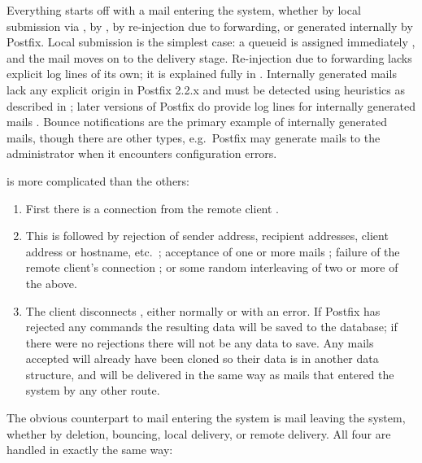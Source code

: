Everything starts off with a mail entering the system, whether by local
submission via , by , by re-injection due to
forwarding, or generated internally by Postfix.  Local submission is the
simplest case: a queueid is assigned immediately , and
the mail moves on to the delivery stage.  Re-injection due to forwarding
lacks explicit log lines of its own; it is explained fully in
.  Internally generated mails lack any
explicit origin in Postfix 2.2.x and must be detected using heuristics as
described in ; later versions
of Postfix do provide log lines for internally generated mails
.  Bounce notifications are the primary
example of internally generated mails, though there are other types, e.g.\
Postfix may generate mails to the administrator when it encounters
configuration errors.

 is more complicated than the others:

\begin{enumerate}

    \item First there is a connection from the remote client
        .

    \item This is followed by rejection of sender address, recipient
        addresses, client \acronym{IP} address or hostname, etc.\
        ; acceptance of one or more mails
        \flowchart{CLONE}{5}; failure of the remote client's connection
        \flowchart{DELIVERY\_ERROR}{6}; or some random interleaving of two
        or more of the above.

    \item The client disconnects , either
        normally or with an error.  If Postfix has rejected any
        \acronym{SMTP} commands the resulting data will be saved to the
        database; if there were no rejections there will not be any data to
        save.  Any mails accepted will already have been cloned so their
        data is in another data structure, and will be delivered in the
        same way as mails that entered the system by any other route.

\end{enumerate}

The obvious counterpart to mail entering the system is mail leaving the
system, whether by deletion, bouncing, local delivery, or remote delivery.
All four are handled in exactly the same way:

